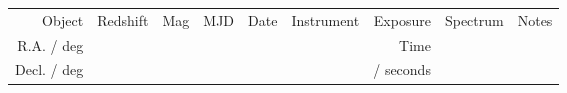\documentclass[a4paper,fleqn,usenatbib]{mnras}
\begin{document}
\begin{table}
 \centering
 \begin{tabular}{r  r  r r r   r r r r}
  \hline \hline 
   Object                         & \multirow{3}{*}{Redshift} & \multirow{3}{*}{Mag}      & \multirow{3}{*}{MJD} & \multirow{3}{*}{Date}  & \multirow{3}{*}{Instrument}   & Exposure    & \multirow{3}{*}{Spectrum} & \multirow{3}{*}{Notes} \\
   R.A. / deg                   &               &               &            &                                &                                                                       &  Time         & & \\
   Decl. / deg                 &               &               &            &                                &                                                                       &  / seconds         & & \\


\end{tabular}
\end{table}
\end{document}
